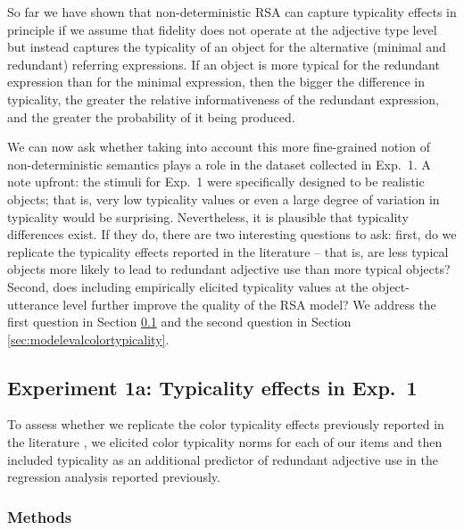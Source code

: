 \documentclass[11pt]{article}
\newcommand{\appref}[1]{Appendix \ref{#1}}
\newcommand{\sectionref}[1]{Section \ref{#1}}
\begin{document}
So far we have shown that non-deterministic RSA can capture typicality effects in principle if we assume that fidelity does not operate at the adjective type level but instead captures the typicality of an object for the alternative (minimal and redundant) referring expressions. If an object is more typical for the redundant expression than for the minimal expression, then the bigger the difference in typicality, the greater the relative informativeness of the redundant expression, and the greater the probability of it being produced.

We can now ask whether taking into account this more fine-grained notion of non-deterministic semantics plays a role in the dataset collected in Exp.~1. 
A note upfront: the stimuli for Exp.~1 were specifically designed to be realistic objects; that is, very low typicality values or even a large degree of variation in typicality would be surprising. Nevertheless, it is plausible that typicality differences exist. If they do, there are two interesting questions to ask: first, do we replicate the typicality effects reported in the literature -- that is, are less typical objects more likely to lead to redundant adjective use than more typical objects? Second, does including empirically elicited typicality values at the object-utterance level further improve the quality of the RSA model? We address the first question in \sectionref{sec:modifiertypicalityeffects} and the second question in \sectionref{sec:modelevalcolortypicality}.

\subsection{Experiment 1a: Typicality effects in Exp.~1}
\label{sec:modifiertypicalityeffects}

To assess whether we replicate the color typicality effects previously reported in the literature \cite{sedivy2003a, Westerbeek2015, rubiofernandez2016}, we elicited color typicality norms for each of our items and then included typicality as an additional predictor of redundant adjective use in the regression analysis reported previously. 

\subsubsection{Methods}
\end{document}
